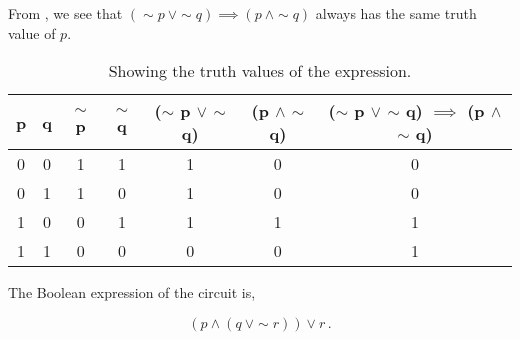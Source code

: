 %
%

\begin{subquestions}

\subquestion

From , we see that $(\sim p ~\lor \sim q) \implies (p ~\land \sim q)$ always has the same truth value of $p$.

\begin{table}[ht]
	\centering
	\begin{tabular}{|c|c|c|c|c|c|c|}
		\hline
		p & q & $\sim$ p & $\sim$ q & ($\sim$ p $\lor$ $\sim$ q) & (p $\land$ $\sim$ q) & ($\sim$ p $\lor$ $\sim$ q) $\implies$ (p $\land$ $\sim$ q) \\
		\hline
		0 & 0 & 1 & 1 & 1 & 0 & 0 \\
		0 & 1 & 1 & 0 & 1 & 0 & 0 \\
		1 & 0 & 0 & 1 & 1 & 1 & 1 \\
		1 & 1 & 0 & 0 & 0 & 0 & 1 \\
		\hline
	\end{tabular}
	\caption{\label{2011:q2:tab:TruthTab1} Showing the truth values of the expression.}
\end{table}


\subquestion

The Boolean expression of the circuit is,

\begin{equation}
	(p \land (q ~\lor \sim r)) \lor r\,.
\end{equation}



\end{subquestions}
